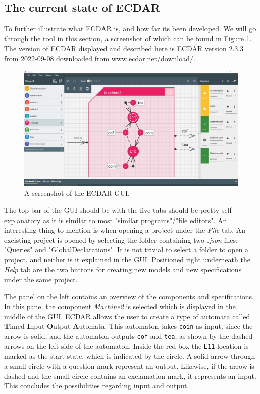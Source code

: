 \subsection{The current state of ECDAR} %
To further illustrate what ECDAR is, and how far its been developed. 
We will go through the tool in this section, a screenshot of which can be found in Figure \ref{fig:ECDAR-gui}. 
The version of ECDAR displayed and described here is ECDAR version 2.3.3 from 2022-09-08 downloaded from \href{https://www.ecdar.net/download/}{www.ecdar.net/download/}.

\begin{figure}[H]
    \centering
    \includegraphics[width=1\textwidth]{common/figures/ecdar-overview.jpg}
    \caption{A screenshot of the ECDAR GUI.}
    \label{fig:ECDAR-gui}
\end{figure}
The top bar of the GUI should be with the five tabs should be pretty self explanatory as it is similar to most "similar programs"/"file editors".
An interesting thing to mention is when opening a project under the \textit{File} tab.
An excisting project is opened by selecting the folder containing two \textit{.json} files: "Queries" and "GlobalDeclarations".
It is not trivial to select a folder to open a project, and neither is it explained in the GUI.
Positioned right underneath the \textit{Help} tab are the two buttons for creating new models and new specifications under the same project.

The panel on the left contains an overview of the components and specifications. 
In this panel the component \textit{Machine2} is selected which is displayed in the middle of the GUI.
ECDAR allows the user to create a type of automata called \textbf{T}imed \textbf{I}nput \textbf{O}utput \textbf{A}utomata. 
This automaton takes \texttt{coin} as input, since the arrow is solid, and the automaton outputs \texttt{cof} and \texttt{tea}, as shown by the dashed arrows on the left side of the automaton.
Inside the red box the \texttt{L11} location is marked as the start state, which is indicated by the circle.
A solid arrow through a small circle with a question mark represent an output. 
Likewise, if the arrow is dashed and the small circle contains an exclamation mark, it represents an input.
This concludes the possibilities regarding input and output.


